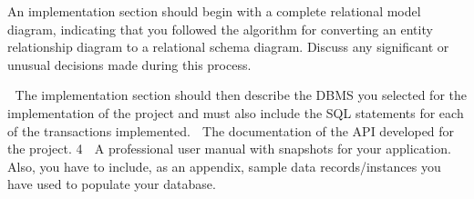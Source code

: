 An implementation section should begin with a complete relational model diagram, indicating that you followed the algorithm for converting an entity relationship diagram to a relational schema diagram. Discuss any significant or unusual decisions made during this process.






 The implementation section should then describe the DBMS you selected for the implementation of
the project and must also include the SQL statements for each of the transactions implemented.
 The documentation of the API developed for the project.
4
 A professional user manual with snapshots for your application. Also, you have to include, as an
appendix, sample data records/instances you have used to populate your database.